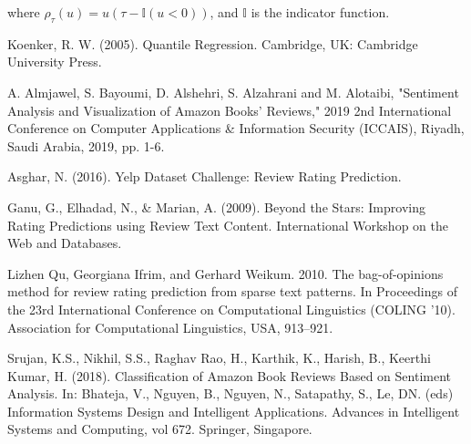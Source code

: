 \documentclass[12pt]{article}
\numberwithin{equation}{section}
\begin{document}
where \( \rho_\tau(u) = u(\tau - \mathbb{I}(u < 0)) \), and \( \mathbb{I} \) is the indicator function.

Koenker, R. W. (2005). Quantile Regression. Cambridge, UK: Cambridge University Press.

A. Almjawel, S. Bayoumi, D. Alshehri, S. Alzahrani and M. Alotaibi, "Sentiment Analysis and Visualization of Amazon Books' Reviews," 2019 2nd International Conference on Computer Applications \& Information Security (ICCAIS), Riyadh, Saudi Arabia, 2019, pp. 1-6.

Asghar, N. (2016). Yelp Dataset Challenge: Review Rating Prediction.

Ganu, G., Elhadad, N., \& Marian, A. (2009). Beyond the Stars: Improving Rating Predictions using Review Text Content. International Workshop on the Web and Databases.

Lizhen Qu, Georgiana Ifrim, and Gerhard Weikum. 2010. The bag-of-opinions method for review rating prediction from sparse text patterns. In Proceedings of the 23rd International Conference on Computational Linguistics (COLING '10). Association for Computational Linguistics, USA, 913–921.

Srujan, K.S., Nikhil, S.S., Raghav Rao, H., Karthik, K., Harish, B., Keerthi Kumar, H. (2018). Classification of Amazon Book Reviews Based on Sentiment Analysis. In: Bhateja, V., Nguyen, B., Nguyen, N., Satapathy, S., Le, DN. (eds) Information Systems Design and Intelligent Applications. Advances in Intelligent Systems and Computing, vol 672. Springer, Singapore.
\end{document}
